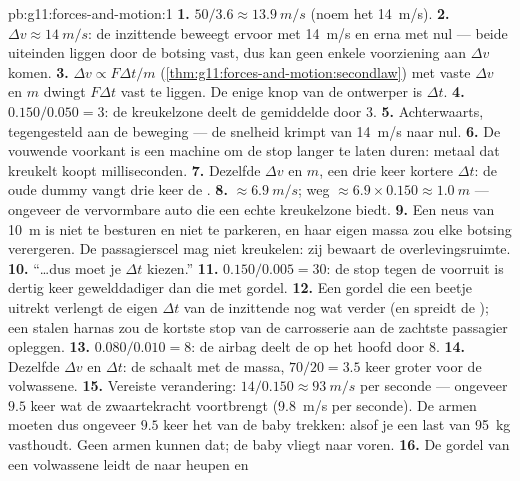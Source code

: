 \begin{solution}{pb:g11:forces-and-motion:1}
\textbf{1.} $50/3.6 \approx \qty{13.9}{m/s}$ (noem het \qty{14}{m/s}).
\textbf{2.} $\Delta v \approx \qty{14}{m/s}$: de inzittende beweegt
ervoor met \qty{14}{m/s} en erna met nul --- beide uiteinden liggen door
de botsing vast, dus kan geen enkele voorziening aan $\Delta v$ komen.
\textbf{3.} $\Delta v \propto F\Delta t/m$
(\cref{thm:g11:forces-and-motion:secondlaw}) met vaste $\Delta v$ en $m$
dwingt $F\Delta t$ vast te liggen. De enige knop van de ontwerper is
$\Delta t$.
\textbf{4.} $0.150/0.050 = 3$: de kreukelzone deelt de gemiddelde 
door $3$.
\textbf{5.} Achterwaarts, tegengesteld aan de beweging --- de snelheid
krimpt van \qty{14}{m/s} naar nul.
\textbf{6.} De vouwende voorkant is een machine om de stop langer te
laten duren: metaal dat kreukelt koopt milliseconden.
\textbf{7.} Dezelfde $\Delta v$ en $m$, een drie keer kortere
$\Delta t$: de oude dummy vangt drie keer de .
\textbf{8.}  $\approx \qty{6.9}{m/s}$; weg
$\approx 6.9 \times 0.150 \approx \qty{1.0}{m}$ --- ongeveer de 
vervormbare auto die een echte kreukelzone biedt.
\textbf{9.} Een neus van \qty{10}{m} is niet te besturen en niet te
parkeren, en haar eigen massa zou elke botsing verergeren. De
passagierscel mag niet kreukelen: zij bewaart de overlevingsruimte.
\textbf{10.} ``\dots dus moet je $\Delta t$ kiezen.''
\textbf{11.} $0.150/0.005 = 30$: de stop tegen de voorruit is dertig keer
gewelddadiger dan die met gordel.
\textbf{12.} Een gordel die een beetje uitrekt verlengt de eigen
$\Delta t$ van de inzittende nog wat verder (en spreidt de ); een
stalen harnas zou de kortste stop van de carrosserie aan de zachtste
passagier opleggen.
\textbf{13.} $0.080/0.010 = 8$: de airbag deelt de  op het hoofd
door $8$.
\textbf{14.} Dezelfde $\Delta v$ en $\Delta t$: de  schaalt met de
massa, $70/20 = 3.5$ keer groter voor de volwassene.
\textbf{15.} Vereiste verandering: $14/0.150 \approx \qty{93}{m/s}$ per
seconde --- ongeveer $9.5$ keer wat de zwaartekracht voortbrengt
(\qty{9.8}{m/s} per seconde). De armen moeten dus ongeveer $9.5$ keer het
 van de baby trekken: alsof je een last van \qty{95}{kg} vasthoudt.
Geen armen kunnen dat; de baby vliegt naar voren.
\textbf{16.} De gordel van een volwassene leidt de  naar heupen en

\end{solution}
